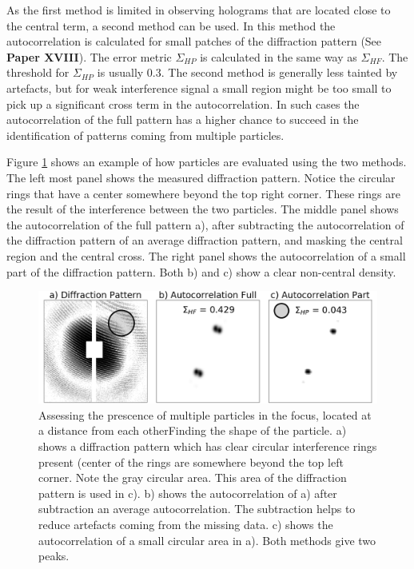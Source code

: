 As the first method is limited in observing holograms that are located close to the central term, a second method can be used. In this method the autocorrelation is calculated for small patches of the diffraction pattern (See \textbf{Paper XVIII}). The error metric $\Sigma_{HP}$ is calculated in the same way as $\Sigma_{HF}$. The threshold for $\Sigma_{HP}$ is usually 0.3. The second method is generally less tainted by artefacts, but for weak interference signal a small region might be too small to pick up a significant cross term in the autocorrelation. In such cases the autocorrelation of the full pattern has a higher chance to succeed in the identification of patterns coming from multiple particles.

Figure \ref{fig:multiplefinding} shows an example of how particles are evaluated using the two methods. The left most panel shows the measured diffraction pattern. Notice the circular rings that have a center somewhere beyond the top right corner. These rings are the result of the interference between the two particles. The middle panel shows the autocorrelation of the full pattern a), after subtracting the autocorrelation of the diffraction pattern of an average diffraction pattern, and masking the central region and the central cross. The right panel shows the autocorrelation of a small part of the diffraction pattern. Both b) and c) show a clear non-central density.

\begin{figure}[!h]
\centering
\includegraphics[width=120mm]{Chapter_08_ImageClassification_Multiple_Finding.png}
\caption{Assessing the prescence of multiple particles in the focus, located at a distance from each otherFinding the shape of the particle. a) shows a diffraction pattern which has clear circular interference rings present (center of the rings are somewhere beyond the top left corner. Note the gray circular area. This area of the diffraction pattern is used in c). b) shows the autocorrelation of a) after subtraction an average autocorrelation. The subtraction helps to reduce artefacts coming from the missing data. c) shows the autocorrelation of a small circular area in a). Both methods give two peaks.  }\label{fig:multiplefinding}
\end{figure}